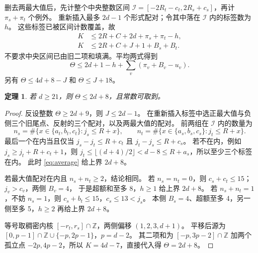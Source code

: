 \documentclass[11pt,a4paper]{article}
\newcommand{\Z}{\mathbb Z}
\newtheorem{theorem}{定理}[section]
\begin{document}
删去两最大值后，先计整个中央整数区间
$\mathcal I=[-2R_t-c_t,2R_s+c_s]$，再计 $\pi_s+\pi_t$ 个例外。
重新插入最多 $2d-1$ 个形式配对；令其中落在 $\mathcal I$ 内的标签数为 $h$。
这些标签已被区间计数覆盖，故
\begin{align}
K&\le2R+C+2d+\pi_s+\pi_t-h,\label{eq:removed}\\
K&\le2R+C+J+1+B_s+B_t.\label{eq:full}
\end{align}
不要求中央区间已由旧二项和填满。平均两式得到
\begin{equation}\label{eq:average}
\Theta\le2d+1-h+\sum_v(\pi_v+B_v-u_v).
\end{equation}
另有 $\Theta\le4d+8-J$ 和 $\Theta\le J+18$。

\begin{theorem}\label{thm:theta}
若 $d\ge21$，则 $\Theta\le2d+8$，且常数可取到。
\end{theorem}
\begin{proof}
反设整数 $\Theta\ge2d+9$，则 $J\le2d-1$。
在重新插入标签中选正最大值与负侧三个旧尾点、反射的三个配对，以及两最大值的配对。
前两组在 $\mathcal I$ 内的数量为
\[
n_s=\#\{x\in\{a_t,b_t,c_t\}:j_s\le R+x\},\qquad
n_t=\#\{x\in\{a_s,b_s,c_s\}:j_t\le R+x\}.
\]
最后一个在内当且仅当 $j_s-j_t\le R+c_t$ 且 $j_t-j_s\le R+c_s$。
若不在内，例如 $j_s\ge j_t+R+c_t+1$，则
$j_t\le\lfloor(d+4)/2\rfloor<d-8\le R+a_s$，所以至少三个标签在内。
此时 \eqref{eq:average} 给上界 $2d+8$。

若最大值配对在内且 $n_s+n_t\ge2$，结论相同。
若 $n_s=n_t=0$，则 $c_s+c_t\le15$；$j_v>c_v$，两侧 $B_v=4$，
于是超额和至多 8，$h\ge1$ 给上界 $2d+8$。
若 $n_s+n_t=1$，不妨 $n_s=1$，则 $c_s+b_t\le15$，$c_s\le13<j_s$。
本侧 $B_s=4$、超额至多 4，另一侧至多 5，$h\ge2$ 再给上界 $2d+8$。

等号取稠密内核 $[-r_t,r_s]\cap\Z$，两侧偏移 $(1,2,3,d+1)$。
平移后源为 $[0,p-1]\cap\Z\cup\{-p,2p-1\}$，$p=d-2$。
其二项和为 $[-p,3p-2]\cap\Z$ 加两个孤立点 $-2p,4p-2$，所以
$K=4d-7$，直接代入得 $\Theta=2d+8$。
\end{proof}
\end{document}
